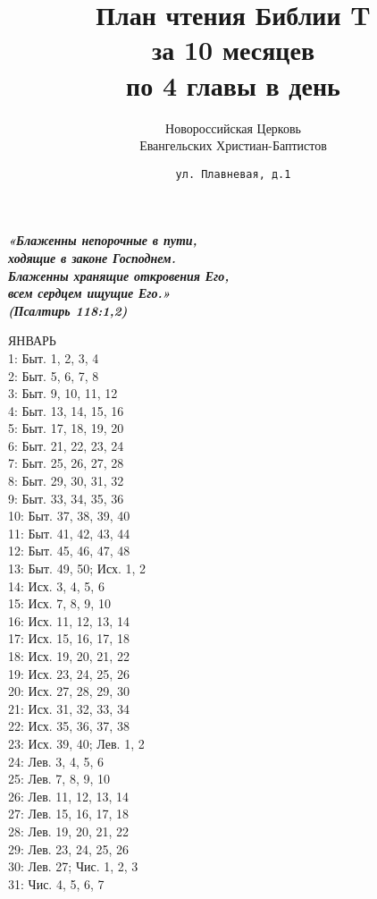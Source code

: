 \documentclass[fontsize=16pt,letterpaper,DIV=6]{scrartcl}
\title{План чтения Библии   T \\за 10 месяцев \\по 4 главы в день}
\author{Новороссийская Церковь\\Евангельских Христиан-Баптистов}
\date{\texttt{ул. Плавневая, д.1}}
\begin{document}
\maketitle
\setcounter{page}{0}
\thispagestyle{empty}
\clearpage
{}
{\centering\Large\itshape\bfseries «Блаженны непорочные в пути,\\ ходящие в законе Господнем.\\
Блаженны хранящие откровения Его,\\ всем сердцем ищущие Его.»\\
(Псалтирь 118:1,2)
\par}
\clearpage
\begin{multicols}{2}
ЯНВАРЬ
\\  1: Быт. 1, 2, 3, 4
\\  2: Быт. 5, 6, 7, 8
\\  3: Быт. 9, 10, 11, 12
\\  4: Быт. 13, 14, 15, 16
\\  5: Быт. 17, 18, 19, 20
\\  6: Быт. 21, 22, 23, 24
\\  7: Быт. 25, 26, 27, 28
\\  8: Быт. 29, 30, 31, 32
\\  9: Быт. 33, 34, 35, 36
\\  10: Быт. 37, 38, 39, 40
\\  11: Быт. 41, 42, 43, 44
\\  12: Быт. 45, 46, 47, 48
\\  13: Быт. 49, 50; Исх. 1, 2
\\  14: Исх. 3, 4, 5, 6
\\  15: Исх. 7, 8, 9, 10
\\  16: Исх. 11, 12, 13, 14
\\  17: Исх. 15, 16, 17, 18
\\  18: Исх. 19, 20, 21, 22
\\  19: Исх. 23, 24, 25, 26
\\  20: Исх. 27, 28, 29, 30
\\  21: Исх. 31, 32, 33, 34
\\  22: Исх. 35, 36, 37, 38
\\  23: Исх. 39, 40; Лев. 1, 2
\\  24: Лев. 3, 4, 5, 6
\\  25: Лев. 7, 8, 9, 10
\\  26: Лев. 11, 12, 13, 14
\\  27: Лев. 15, 16, 17, 18
\\  28: Лев. 19, 20, 21, 22
\\  29: Лев. 23, 24, 25, 26
\\  30: Лев. 27; Чис. 1, 2, 3
\\  31: Чис. 4, 5, 6, 7


\end{multicols}
\end{document}

